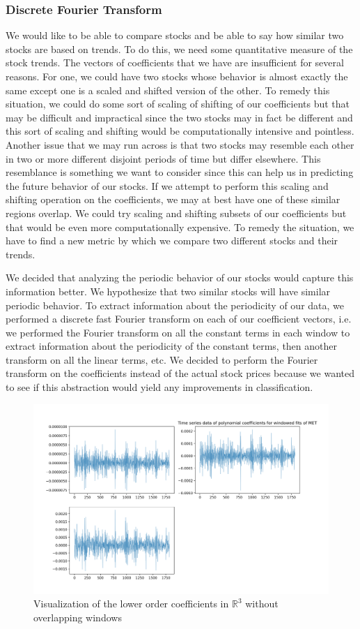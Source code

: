 \documentclass[final]{article}
\begin{document}
\subsubsection{Discrete Fourier Transform}

We would like to be able to compare stocks and be able to say how
similar two stocks are based on trends. To do this, we need some
quantitative measure of the stock trends. The vectors of coefficients
that we have are insufficient for several reasons. For one, we could
have two stocks whose behavior is almost exactly the same except one
is a scaled and shifted version of the other. To remedy this
situation, we could do some sort of scaling of shifting of our
coefficients but that may be difficult and impractical since the two
stocks may in fact be different and this sort of scaling and shifting
would be computationally intensive and pointless. Another issue that
we may run across is that two stocks may resemble each other in two or
more different disjoint periods of time but differ elsewhere. This
resemblance is something we want to consider since this can help us in
predicting the future behavior of our stocks. If we attempt to perform
this scaling and shifting operation on the coefficients, we may at
best have one of these similar regions overlap. We could try scaling
and shifting subsets of our coefficients but that would be even more
computationally expensive. To remedy the situation, we have to find a
new metric by which we compare two different stocks and their trends.

We decided that analyzing the periodic behavior of our stocks would
capture this information better. We hypothesize that two similar
stocks will have similar periodic behavior. To extract information
about the periodicity of our data, we performed a discrete fast
Fourier transform on each of our coefficient vectors, i.e. we
performed the Fourier transform on all the constant terms in each
window to extract information about the periodicity of the constant
terms, then another transform on all the linear terms, etc. We decided
to perform the Fourier transform on the coefficients instead of the
actual stock prices because we wanted to see if this abstraction would
yield any improvements in classification.


\begin{figure}[H]
  \centering
  \includegraphics[width=.55\linewidth]{img/fourier1}
  \caption{Visualization of the lower order coefficients in $\mathbb{R}^3$
  without overlapping windows}
  \label{fig:fourier1}
\end{figure}
\end{document}
